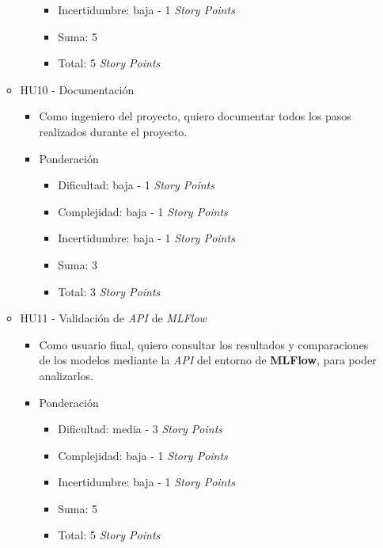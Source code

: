 \documentclass[
11pt, %
]{charter}
\begin{document}
\begin{itemize}
\begin{itemize}
\begin{itemize}
\begin{itemize}
                \item Incertidumbre: baja - 1 \textit{Story Points}
                \item Suma: 5
                \item Total: 5 \textit{Story Points}
            \end{itemize}
        \end{itemize}
      \item HU10 - Documentación
        \begin{itemize}
            \item Como ingeniero del proyecto, quiero documentar todos los pasos realizados durante el proyecto.
            \item Ponderación
            \begin{itemize}
                \item Dificultad: baja - 1 \textit{Story Points}
                \item Complejidad: baja - 1 \textit{Story Points}
                \item Incertidumbre: baja - 1 \textit{Story Points}
                \item Suma: 3
                \item Total: 3 \textit{Story Points}
            \end{itemize}
        \end{itemize}
\newpage        
      \item HU11 - Validación de \textit{API} de \textit{MLFlow}
        \begin{itemize}
            \item Como usuario final, quiero consultar los resultados y comparaciones de los modelos mediante la \textit{API} del entorno de \textbf{MLFlow}, para poder analizarlos.
            \item Ponderación
            \begin{itemize}
                \item Dificultad: media - 3 \textit{Story Points}
                \item Complejidad: baja - 1 \textit{Story Points}
                \item Incertidumbre: baja - 1 \textit{Story Points}
                \item Suma: 5
                \item Total: 5 \textit{Story Points}
            \end{itemize}
        \end{itemize}        
    \end{itemize}
\end{itemize}
\end{document}
